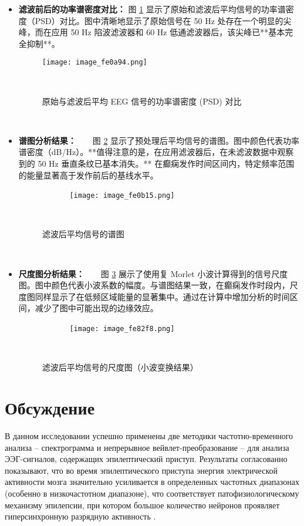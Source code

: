 \documentclass{article}
\providecommand{\pcsync}{\par\vspace{\baselineskip}} %
\begin{document}
\begin{paracol}{2}
\begin{itemize}
 \item \textbf{滤波前后的功率谱密度对比：}
 图 \ref{fig:psd} 显示了原始和滤波后平均信号的功率谱密度（PSD）对比。图中清晰地显示了原始信号在 50 Hz 处存在一个明显的尖峰，而在应用 50 Hz 陷波滤波器和 60 Hz 低通滤波器后，该尖峰已**基本完全抑制**。
\begin{figure}[H]
 \centering
 \texttt{[image: image\_fe0a94.png]} %
 \caption{原始与滤波后平均 EEG 信号的功率谱密度 (PSD) 对比} %
    \label{fig:psd} %
\end{figure}

    \item \textbf{谱图分析结果：}
    图 \ref{fig:spectrogram} 显示了预处理后平均信号的谱图。图中颜色代表功率谱密度（dB/Hz）。**值得注意的是，在应用滤波器后，在未滤波数据中观察到的 50 Hz 垂直条纹已基本消失。** 在癫痫发作时间区间内，特定频率范围的能量显著高于发作前后的基线水平。
\begin{figure}[H]
    \centering
    \texttt{[image: image\_fe0b15.png]} %
    \caption{滤波后平均信号的谱图} %
    \label{fig:spectrogram} %
\end{figure}

    \item \textbf{尺度图分析结果：}
    图 \ref{fig:scalogram} 展示了使用复 Morlet 小波计算得到的信号尺度图。图中颜色代表小波系数的幅度。与谱图结果一致，在癫痫发作时段内，尺度图同样显示了在低频区域能量的显著集中。通过在计算中增加分析的时间区间，减少了图中可能出现的边缘效应。
\begin{figure}[H]
    \centering
    \texttt{[image: image\_fe82f8.png]} %
    \caption{滤波后平均信号的尺度图（小波变换结果）} %
    \label{fig:scalogram} %
\end{figure}
\end{itemize}
\switchcolumn* %


\section{Обсуждение}
\pcsync

В данном исследовании успешно применены две методики частотно-временного анализа – спектрограмма и непрерывное вейвлет-преобразование – для анализа ЭЭГ-сигналов, содержащих эпилептический приступ. Результаты согласованно показывают, что во время эпилептического приступа энергия электрической активности мозга значительно усиливается в определенных частотных диапазонах (особенно в низкочастотном диапазоне), что соответствует патофизиологическому механизму эпилепсии, при котором большое количество нейронов проявляет гиперсинхронную разрядную активность \cite{Jiruska2013}.


\end{paracol}
\end{document}
